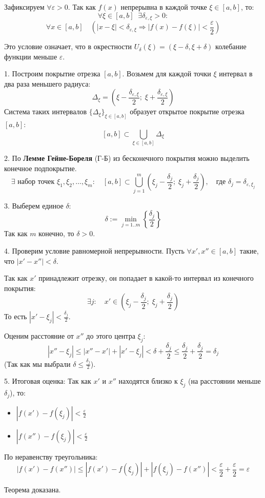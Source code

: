 \begin{tcolorbox}[title=Доказательство (через Лемму Гейне-Бореля)]
    Зафиксируем $\forall \varepsilon > 0$.
    Так как $f(x)$ непрерывна в каждой точке $\xi \in [a, b]$, то:
    \[ \forall \xi \in [a, b] \;\; \exists \delta_{\varepsilon, \xi} > 0: \]
    \[ \forall x \in [a, b] \quad (|x - \xi| < \delta_{\varepsilon, \xi} \Rightarrow |f(x) - f(\xi)| < \frac{\varepsilon}{2}) \]
    
    Это условие означает, что в окрестности $U_{\delta}(\xi) = (\xi - \delta, \xi + \delta)$ колебание функции меньше $\varepsilon$.
    
    1. Построим покрытие отрезка $[a, b]$.
    Возьмем для каждой точки $\xi$ интервал в два раза меньшего радиуса:
    \[ \Delta_\xi = \left( \xi - \frac{\delta_{\varepsilon, \xi}}{2}; \; \xi + \frac{\delta_{\varepsilon, \xi}}{2} \right) \]
    Система таких интервалов $\{\Delta_\xi\}_{\xi \in [a, b]}$ образует открытое покрытие отрезка $[a, b]$:
    \[ [a, b] \subset \bigcup_{\xi \in [a, b]} \Delta_\xi \]
    
    2. По \textbf{Лемме Гейне-Бореля} (Г-Б) из бесконечного покрытия можно выделить конечное подпокрытие.
    \[ \exists \text{ набор точек } \xi_1, \xi_2, \dots, \xi_m: \quad [a, b] \subset \bigcup_{j=1}^m \left( \xi_j - \frac{\delta_j}{2}; \; \xi_j + \frac{\delta_j}{2} \right), \quad \text{где } \delta_j = \delta_{\varepsilon, \xi_j} \]
    
    3. Выберем единое $\delta$:
    \[ \delta := \min_{j=1..m} \left\{ \frac{\delta_j}{2} \right\} \]
    Так как $m$ конечно, то $\delta > 0$.
    
    4. Проверим условие равномерной непрерывности.
    Пусть $\forall x', x'' \in [a, b]$ такие, что $|x' - x''| < \delta$.
    
    Так как $x'$ принадлежит отрезку, он попадает в какой-то интервал из конечного покрытия:
    \[ \exists j: \quad x' \in \left( \xi_j - \frac{\delta_j}{2}; \; \xi_j + \frac{\delta_j}{2} \right) \]
    То есть $|x' - \xi_j| < \frac{\delta_j}{2}$.
    
    Оценим расстояние от $x''$ до этого центра $\xi_j$:
    \[ |x'' - \xi_j| \le |x'' - x'| + |x' - \xi_j| < \delta + \frac{\delta_j}{2} \le \frac{\delta_j}{2} + \frac{\delta_j}{2} = \delta_j \]
    (Так как мы выбрали $\delta \le \frac{\delta_j}{2}$).
    
    5. Итоговая оценка:
    Так как $x'$ и $x''$ находятся близко к $\xi_j$ (на расстоянии меньше $\delta_j$), то:
    \begin{itemize}
        \item $|f(x') - f(\xi_j)| < \frac{\varepsilon}{2}$
        \item $|f(x'') - f(\xi_j)| < \frac{\varepsilon}{2}$
    \end{itemize}
    
    По неравенству треугольника:
    \[ |f(x') - f(x'')| \le |f(x') - f(\xi_j)| + |f(\xi_j) - f(x'')| < \frac{\varepsilon}{2} + \frac{\varepsilon}{2} = \varepsilon \]
    
    Теорема доказана.
\end{tcolorbox}




